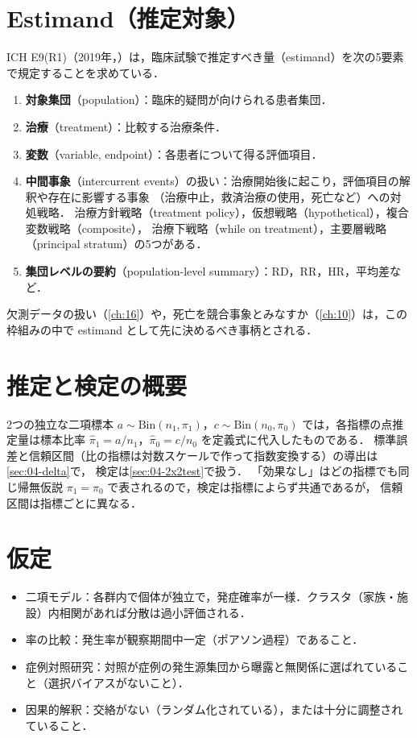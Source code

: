 \documentclass[a4paper,11pt,openany]{ltjsbook}
\newcommand{\Bin}{\mathrm{Bin}}
\begin{document}
\section{Estimand（推定対象）}\label{sec:02-estimand}
ICH E9(R1)（2019年，\cite{ich:e9r1}）は，臨床試験で推定すべき量（estimand）を次の5要素で規定することを求めている．
\begin{enumerate}
\item \textbf{対象集団}（population）：臨床的疑問が向けられる患者集団．
\item \textbf{治療}（treatment）：比較する治療条件．
\item \textbf{変数}（variable, endpoint）：各患者について得る評価項目．
\item \textbf{中間事象}（intercurrent events）の扱い：治療開始後に起こり，評価項目の解釈や存在に影響する事象
      （治療中止，救済治療の使用，死亡など）への対処戦略．
      治療方針戦略（treatment policy），仮想戦略（hypothetical），複合変数戦略（composite），
      治療下戦略（while on treatment），主要層戦略（principal stratum）の5つがある．
\item \textbf{集団レベルの要約}（population-level summary）：RD，RR，HR，平均差など．
\end{enumerate}
欠測データの扱い（\cref{ch:16}）や，死亡を競合事象とみなすか（\cref{ch:10}）は，この枠組みの中で estimand として先に決めるべき事柄とされる．

\section{推定と検定の概要}\label{sec:02-inference}
2つの独立な二項標本 $a\sim\Bin(n_1,\pi_1)$，$c\sim\Bin(n_0,\pi_0)$ では，各指標の点推定量は標本比率 $\hat\pi_1=a/n_1$，$\hat\pi_0=c/n_0$ を定義式に代入したものである．
標準誤差と信頼区間（比の指標は対数スケールで作って指数変換する）の導出は\cref{sec:04-delta}で，
検定は\cref{sec:04-2x2test}で扱う．
「効果なし」はどの指標でも同じ帰無仮説 $\pi_1=\pi_0$ で表されるので，検定は指標によらず共通であるが，
信頼区間は指標ごとに異なる．

\section{仮定}\label{sec:02-assump}
\begin{itemize}
\item 二項モデル：各群内で個体が独立で，発症確率が一様．クラスタ（家族・施設）内相関があれば分散は過小評価される．
\item 率の比較：発生率が観察期間中一定（ポアソン過程）であること．
\item 症例対照研究：対照が症例の発生源集団から曝露と無関係に選ばれていること（選択バイアスがないこと）．
\item 因果的解釈：交絡がない（ランダム化されている），または十分に調整されていること．
\end{itemize}
\end{document}
